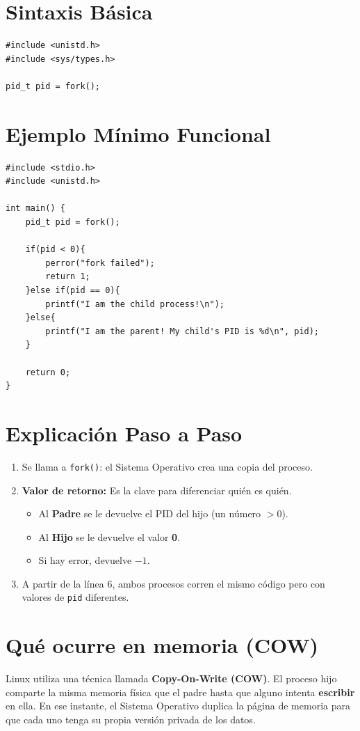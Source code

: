\documentclass[12pt,a4paper]{article}
\begin{document}
\section{Sintaxis Básica}
\begin{lstlisting}[numbers=none]
#include <unistd.h>
#include <sys/types.h>

pid_t pid = fork();
\end{lstlisting}

\section{Ejemplo Mínimo Funcional}
\begin{lstlisting}
#include <stdio.h>
#include <unistd.h>

int main() {
    pid_t pid = fork();

    if(pid < 0){
        perror("fork failed");
        return 1;
    }else if(pid == 0){
        printf("I am the child process!\n");
    }else{
        printf("I am the parent! My child's PID is %d\n", pid);
    }

    return 0;
}
\end{lstlisting}

\section{Explicación Paso a Paso}
\begin{enumerate}
    \item Se llama a \texttt{fork()}: el Sistema Operativo crea una copia del proceso.
    \item \textbf{Valor de retorno:} Es la clave para diferenciar quién es quién.
    \begin{itemize}
        \item Al \textbf{Padre} se le devuelve el PID del hijo (un número $> 0$).
        \item Al \textbf{Hijo} se le devuelve el valor \textbf{0}.
        \item Si hay error, devuelve $-1$.
    \end{itemize}
    \item A partir de la línea 6, ambos procesos corren el mismo código pero con valores de \texttt{pid} diferentes.
\end{enumerate}

\section{Qué ocurre en memoria (COW)}
Linux utiliza una técnica llamada \textbf{Copy-On-Write (COW)}. El proceso hijo comparte la misma memoria física que el padre hasta que alguno intenta \textbf{escribir} en ella. En ese instante, el Sistema Operativo duplica la página de memoria para que cada uno tenga su propia versión privada de los datos.
\end{document}
